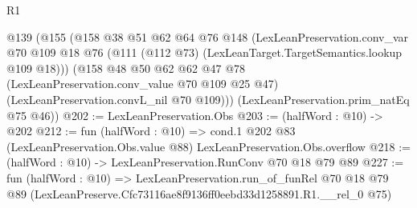 \begin{lexlean}{R1}
\begin{coremodule}
  @139
    (@155
      (@158
        @38
        @51
        @62
        @64
        @76
        @148
        (LexLeanPreservation.conv_var
          @70
          @109
          @18
          @76
          (@111 (@112 @73) (LexLeanTarget.TargetSemantics.lookup @109 @18)))
        (@158
          @48
          @50
          @62
          @62
          @47
          @78
          (LexLeanPreservation.conv_value @70 @109 @25 @47)
          (LexLeanPreservation.convL_nil @70 @109)))
      (LexLeanPreservation.prim_natEq @75 @46))
@202 := LexLeanPreservation.Obs
@203 := (halfWord : @10) -> @202
@212 := fun (halfWord : @10) =>
  cond.{1} @202 @83 (LexLeanPreservation.Obs.value @88) LexLeanPreservation.Obs.overflow
@218 := (halfWord : @10) -> LexLeanPreservation.RunConv @70 @18 @79 @89
@227 := fun (halfWord : @10) =>
  LexLeanPreservation.run_of_funRel
    @70
    @18
    @79
    @89
    (LexLeanPreserve.Cfc73116ae8f9136ff0eebd33d1258891.R1.__rel_0 @75)
\end{coremodule}
\end{lexlean}
